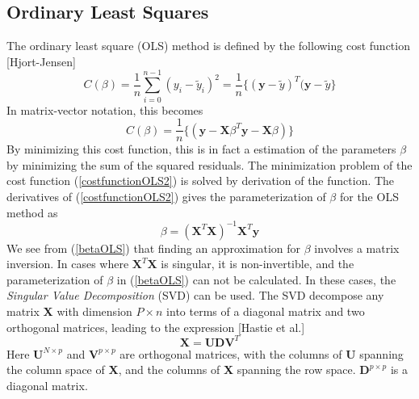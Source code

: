 \documentclass{article}
\begin{document}
\subsection{Ordinary Least Squares}\label{OLSsection}
The ordinary least square (OLS) method is defined by the following cost function [Hjort-Jensen]
\begin{equation}\label{costfunctionOLS}
C(\beta) = \frac{1}{n} \sum_{i=0}^{n-1} (y_{i} - \tilde{y}_{i})^{2} = \frac{1}{n} \{ (\textbf{y} - \tilde{y})^{T} (\textbf{y} - \tilde{y} \}
\end{equation}
In matrix-vector notation, this becomes
\begin{equation}\label{costfunctionOLS2}
C(\beta)= \dfrac{1}{n} \{( \textbf{y}-\textbf{X}\beta^{T}\textbf{y}-\textbf{X}\beta)\}
\end{equation}
By minimizing this cost function, this is in fact a estimation of the parameters $\beta$ by minimizing the sum of the squared residuals. The minimization problem of the cost function (\ref{costfunctionOLS2}) is solved by derivation of the function. The derivatives of (\ref{costfunctionOLS2}) gives the parameterization of $\beta$ for the OLS method as
\begin{equation}\label{betaOLS}
\beta = (\textbf{X}^{T}\textbf{X})^{-1}\textbf{X}^{T}\textbf{y}
\end{equation}
We see from (\ref{betaOLS}) that finding an approximation for $\beta$ involves a matrix inversion. In cases where $\textbf{X}^{T}\textbf{X}$ is singular, it is non-invertible, and the parameterization of $\beta$ in (\ref{betaOLS}) can not be calculated. In these cases, the \textit{Singular Value Decomposition} (SVD) can be used. The SVD decompose any matrix \textbf{X} with dimension $P \times n$ into terms of a diagonal matrix and two orthogonal matrices, leading to the expression [Hastie et al.]
\begin{equation}
\textbf{X} = \textbf{U} \textbf{D} \textbf{V}^{T}
\end{equation}
Here $\textbf{U}^{N \times p}$ and $\textbf{V}^{p \times p}$ are orthogonal matrices, with the columns of \textbf{U} spanning the column space of \textbf{X}, and the columns of \textbf{X} spanning the row space. $\textbf{D}^{p \times p}$ is a diagonal matrix.
\end{document}

